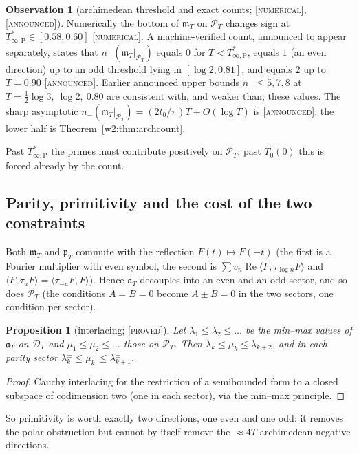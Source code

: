 \documentclass[11pt]{amsart}
\newtheorem{proposition}[theorem]{Proposition}
\theoremstyle{definition}
\newtheorem{observation}[theorem]{Observation}
\theoremstyle{remark}
\numberwithin{equation}{section}
\DeclareMathOperator{\Rel}{Re}
\newcommand{\PT}{\mathcal{P}_T}                        %
\newcommand{\DT}{\mathcal{D}_T}                        %
\newcommand{\mT}{\mathfrak{m}_T}                       %
\newcommand{\pT}{\mathfrak{p}_T}                       %
\newcommand{\aT}{\mathfrak{a}_T}                       %
\newcommand{\Tarch}{T^{*}_{\infty,\mathrm P}}          %
\newcommand{\stag}[1]{\textsc{[#1]}}
\newcommand{\PROVED}{\stag{proved}}
\newcommand{\NUM}{\stag{numerical}}
\newcommand{\ANNOUNCED}{\stag{announced}}
\begin{document}
\begin{observation}[archimedean threshold and exact counts; \NUM, \ANNOUNCED]\label{w2:obs:arch}
Numerically the bottom of $\mT$ on $\PT$ changes sign at $\Tarch\in[0.58,0.60]$ \NUM. A machine-verified count,
announced to appear separately, states that $n_-(\mT|_{\PT})$ equals $0$ for $T<\Tarch$, equals $1$ (an even
direction) up to an odd threshold lying in $[\log2,0.81]$, and equals $2$ up to $T=0.90$ \ANNOUNCED. Earlier announced
upper bounds $n_-\le5,7,8$ at $T=\frac12\log3,\ \log2,\ 0.80$ are consistent with, and weaker than, these values. The
sharp asymptotic $n_-(\mT|_{\PT})=(2t_0/\pi)T+O(\log T)$ is \ANNOUNCED; the lower half is
Theorem~\ref{w2:thm:archcount}.
\end{observation}

Past $\Tarch$ the primes must contribute positively on $\PT$; past $T_0(0)$ this is forced already by the count.

\subsection{Parity, primitivity and the cost of the two constraints}

Both $\mT$ and $\pT$ commute with the reflection $F(t)\mapsto F(-t)$ (the first is a Fourier multiplier with even
symbol, the second is $\sum v_n\Rel\langle F,\tau_{\log n}F\rangle$ and $\langle F,\tau_uF\rangle=\langle
\tau_{-u}F,F\rangle$). Hence $\aT$ decouples into an even and an odd sector, and so does $\PT$ (the conditions $A=B=0$
become $A\pm B=0$ in the two sectors, one condition per sector).

\begin{proposition}[interlacing; \PROVED]\label{w2:prop:interlace}
Let $\lambda_1\le\lambda_2\le\dots$ be the min--max values of $\aT$ on $\DT$ and $\mu_1\le\mu_2\le\dots$ those on
$\PT$. Then $\lambda_k\le\mu_k\le\lambda_{k+2}$, and in each parity sector $\lambda^{\pm}_k\le\mu^{\pm}_k\le\lambda^\pm_{k+1}$.
\end{proposition}

\begin{proof}
Cauchy interlacing for the restriction of a semibounded form to a closed subspace of codimension two (one in each
sector), via the min--max principle.
\end{proof}

So primitivity is worth exactly two directions, one even and one odd: it removes the polar obstruction but cannot by
itself remove the $\approx4T$ archimedean negative directions.
\end{document}
